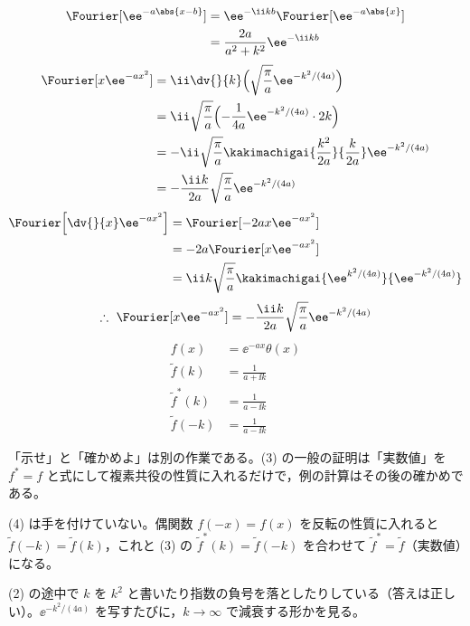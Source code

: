 \begin{align*}
  \Fourier[\ee^{-a\abs{x-b}}]&=\ee^{-\ii kb}\Fourier[\ee^{-a\abs{x}}]\\
  &=\frac{2a}{a^{2}+k^{2}}\ee^{-\ii kb}
\end{align*}
\begin{align*}
  \Fourier[x\ee^{-ax^{2}}]&=\ii\dv{}{k}\Bigl(\sqrt{\frac{\pi}{a}}\ee^{-k^{2}/(4a)}\Bigr)\\
  &=\ii\sqrt{\frac{\pi}{a}}\Bigl(-\frac{1}{4a}\ee^{-k^{2}/(4a)}\cdot2k\Bigr)\\
  &=-\ii\sqrt{\frac{\pi}{a}}\kakimachigai{\frac{k^{2}}{2a}}{\frac{k}{2a}}\ee^{-k^{2}/(4a)}\\
  &=-\frac{\ii k}{2a}\sqrt{\frac{\pi}{a}}\ee^{-k^{2}/(4a)}
\end{align*}
\begin{align*}
  \Fourier\Bigl[\dv{}{x}\ee^{-ax^{2}}\Bigr]&=\Fourier[-2ax\ee^{-ax^{2}}]\\
  &=-2a\Fourier[x\ee^{-ax^{2}}]\\
  &=\ii k\sqrt{\frac{\pi}{a}}\kakimachigai{\ee^{k^{2}/(4a)}}{\ee^{-k^{2}/(4a)}}
\end{align*}
\[ \therefore\ \Fourier[x\ee^{-ax^{2}}]=-\frac{\ii k}{2a}\sqrt{\frac{\pi}{a}}\ee^{-k^{2}/(4a)} \]
\begin{align*}
  f(x)&=\ee^{-ax}\theta(x)\\
  \tilde f(k)&=\frac{1}{a+\ii k}\\
  \tilde f^{*}(k)&=\frac{1}{a-\ii k}\\
  \tilde f(-k)&=\frac{1}{a-\ii k}
\end{align*}
\mikai
\item 「示せ」と「確かめよ」は別の作業である。(3) の一般の証明は「実数値」を $f^{*}=f$ と式にして複素共役の性質に入れるだけで，例の計算はその後の確かめである。
\item (4) は手を付けていない。偶関数 $f(-x)=f(x)$ を反転の性質に入れると $\tilde f(-k)=\tilde f(k)$，これと (3) の $\tilde f^{*}(k)=\tilde f(-k)$ を合わせて $\tilde f^{*}=\tilde f$（実数値）になる。
\item (2) の途中で $k$ を $k^{2}$ と書いたり指数の負号を落としたりしている（答えは正しい）。$\ee^{-k^{2}/(4a)}$ を写すたびに，$k\to\infty$ で減衰する形かを見る。
